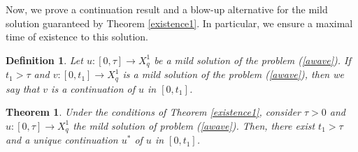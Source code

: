 \documentclass[12pt,reqno]{amsart}
\newtheorem{theorem}{Theorem}
\newtheorem{de}{Definition}
\begin{document}
Now, we prove a continuation result and a blow-up alternative for the mild solution guaranteed by Theorem \ref{existence1}. In particular, we ensure a maximal time of existence to this solution.

\begin{de} Let $u:[0,\tau]\to X^{1}_{q}$ be a mild solution of the problem (\ref{awave}). If $t_1>\tau$ and $v:[0, t_1]\to X^{1}_{q}$ is a mild solution of the problem (\ref{awave}), then we say that $v$ is a continuation of $u$ in $[0, t_1]$.
\end{de}

\begin{theorem}\label{continuation}
	Under the conditions of Theorem \ref{existence1}, consider $\tau>0$ and $u: [0,\tau ]\rightarrow X^{1}_{q}$ the mild solution of problem (\ref{awave}). Then, there exist $t_1>\tau$ and a unique continuation $u^*$ of $u$ in $[0,t_1]$.
\end{theorem}
\end{document}
